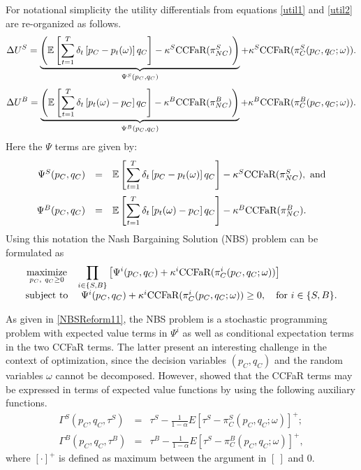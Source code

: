 For notational simplicity the utility differentials from equations \eqref{util1} and \eqref{util2} are re-organized as follows.
\begin{equation}
\Delta U^S = \underbrace{\displaystyle \left( \mathbb{E} \left[ \sum_{t=1}^T \delta_t
	\left[p_C - p_t(\omega) \right]q_C \right]  - \kappa^S
	\text{CCFaR}(\pi_{NC}^S)\right)}_{\Psi^S(p_C, q_C)} + \kappa^S
\text{CCFaR}(\pi_C^S(p_C, q_C; \omega)).\\
\end{equation}
\begin{equation}
\Delta U^B = \underbrace{\displaystyle \left( \mathbb{E} \left[ \sum_{t=1}^T \delta_t
	\left[p_t(\omega) - p_C\right]q_C \right]  - \kappa^B
	\text{CCFaR}(\pi_{NC}^B)\right)}_{\Psi^B(p_C, q_C)} + \kappa^B
\text{CCFaR}(\pi_C^B(p_C, q_C; \omega)).
\end{equation}
Here the $\Psi$ terms are given by:
\begin{equation}
\begin{array}{rcl}
\Psi^S(p_C, q_C) & = & \mathbb{E} \left[\displaystyle \sum_{t=1}^T \delta_t \left[p_C -
p_t(\omega) \right]q_C \right]  - \kappa^S \text{CCFaR}(\pi_{NC}^S),\
\mathrm{and} \\ [15pt] 
\Psi^B(p_C, q_C) & = & \mathbb{E} \left[ \displaystyle \sum_{t=1}^T \delta_t
\left[p_t(\omega) - p_C\right]q_C \right] - \kappa^B \text{CCFaR}(\pi_{NC}^B).
\end{array}
\end{equation}
\noindent Using this notation the Nash Bargaining Solution (NBS) problem can be formulated as 
\begin{equation}\label{NBSReform11}
\begin{array}{cl}
\displaystyle\mathop{\hbox{\rm maximize}}_{p_C,\ q_C \geq 0} & \displaystyle \prod_{i \in \{S,B\}} \left[\Psi^i(p_C, q_C) + \kappa^i \text{CCFaR}(\pi_{C}^i(p_C, q_C; \omega))\right] \\
\mathrm{subject\ to} &\ \Psi^i(p_C, q_C) + \kappa^i \text{CCFaR}(\pi_{C}^i(p_C, q_C; \omega))
\geq 0, \quad \text{for} \ i \in \{S,B\}.
\end{array}
\end{equation}

\noindent As given in \eqref{NBSReform11}, the NBS problem is a stochastic
programming problem with expected value terms in $\Psi^i$ as well as conditional
expectation terms in the two CCFaR terms. The latter present an interesting
challenge in the context of optimization, since the decision variables $(p_C,
q_C)$ and the random variables $\omega$ cannot be decomposed. However,
\cite{rockafellar_optimization_2000} showed that the CCFaR terms may be
expressed in terms of expected value functions by
using the following auxiliary functions.
\begin{equation*}
	\begin{array}{ccl}
		\Gamma^S (p_C, q_C, \tau^S) &= &\displaystyle \tau^S - \frac{1}{1 - \alpha} E[\tau^S - \pi_C^S(p_C, q_C; \omega)]^+;\\[10pt]
		\Gamma^B (p_C, q_C, \tau^B) &= &\displaystyle \tau^B - \frac{1}{1 - \alpha} E[\tau^S - \pi_C^B(p_C, q_C; \omega)]^+,
	\end{array}
\end{equation*}
\noindent where $[\cdot]^+$ is defined as maximum between the argument in $[\ ]$
and 0. 

